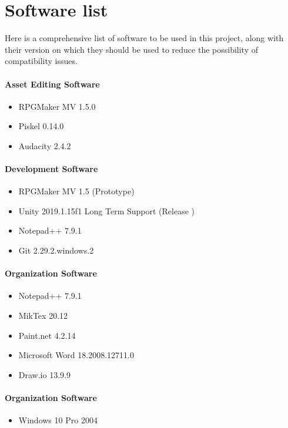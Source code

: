 \section{Software list}
Here is a comprehensive list of software to be used in this project, along with their version on which they should be used to reduce the possibility of compatibility issues.

\paragraph{Asset Editing Software}
\begin{itemize}
	\item RPGMaker MV 1.5.0 
	\item Piskel 0.14.0
	\item Audacity 2.4.2 
\end{itemize}

\paragraph{Development Software}
\begin{itemize}
	\item RPGMaker MV 1.5 (Prototype)
	\item Unity 2019.1.15f1 Long Term Support  (Release )
	\item Notepad++ 7.9.1 
	\item Git 2.29.2.windows.2
\end{itemize}

\paragraph{Organization Software}
\begin{itemize}
	\item Notepad++ 7.9.1
	\item MikTex 20.12
	\item Paint.net 4.2.14
	\item Microsoft Word 18.2008.12711.0
	\item Draw.io 13.9.9 
\end{itemize}

\paragraph{Organization Software}
\begin{itemize}
	\item Windows 10 Pro 2004
\end{itemize}
\pagebreak